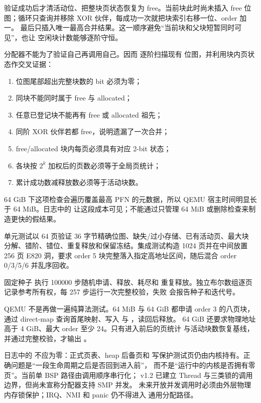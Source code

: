 验证成功后才清活动位、把整块页状态恢复为 free。当前块此时尚未插入 free
位图；循环只查询并移除 XOR 伙伴，每成功一次就把块索引右移一位、order 加一。
最后只插入唯一最高合并结果。这一顺序避免“当前块和父块短暂同时可见”，也让
空闲块计数能够逐阶守恒。

分配器不能为了验证自己再调用自己。因而  逐阶扫描现有
位图，并利用块内页状态作交叉证据：

\begin{enumerate}
  \item 位图尾部超出完整块数的 bit 必须为零；
  \item 同块不能同时属于 free 与 allocated；
  \item 任意已登记块不能再有 free 或 allocated 祖先；
  \item 同阶 XOR 伙伴若都 free，说明遗漏了一次合并；
  \item free/allocated 块内每页必须具有对应 2-bit 状态；
  \item 各块按 \(2^k\) 加权后的页数必须等于全局页统计；
  \item 累计成功数减释放数必须等于活动块数。
\end{enumerate}

64 GiB 下这项检查会遍历覆盖最高 PFN 的元数据，所以 QEMU 宿主时间明显长于
64 MiB。日志中的 \code{[QEMU][T+......ms]} 让这段成本可见；不能通过只管理
64 MiB 或删除检查来制造更快的假结果。

单元测试以 64 页验证 36 字节精确位图、缺失/过小存储、已有活动页、最大块
分解、错阶、错位、重复释放和保留冻结。集成测试构造 1024 页并在中间放置
256 页 E820 洞，要求 order 5 块完整落入指定高地址区间，随后混合 order
0/3/5/6 并乱序回收。

固定种子  执行 100000 步随机申请、释放、耗尽和
重复释放。独立布尔数组逐页记录参考所有权，每 257 步运行一次完整校验，失败
会报告种子和迭代号。

QEMU 不是再做一遍纯算法测试。64 MiB 与 64 GiB 都申请 order 3 的八页块，
通过 direct-map 查询首尾映射、写入
 与 ，读回后释放。
64 GiB 还要求物理地址高于 4 GiB、最大 order 至少 24。只有进入前后的页统计
与活动块数恢复基线，并通过完整校验，才输出
。

日志中的  不应为零：正式页表、heap 后备页和
写保护测试页仍由内核持有。正确问题是“一段生命周期之后是否回到进入前”，
而不是“运行中的内核是否拥有零页”。当前单 BSP 路径由调用顺序串行化；
v1.2 已建立 Thread 与三类锁的调用边界，但尚未宣称分配器支持 SMP 并发。
未来开放并发调用时必须由外层物理内存锁保护；IRQ、NMI 和 panic 仍不得进入
通用分配路径。

